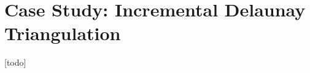 \FloatBarrier
\section{Case Study: Incremental Delaunay Triangulation}
\label{sec:case-delaunay}

[todo]








% 

